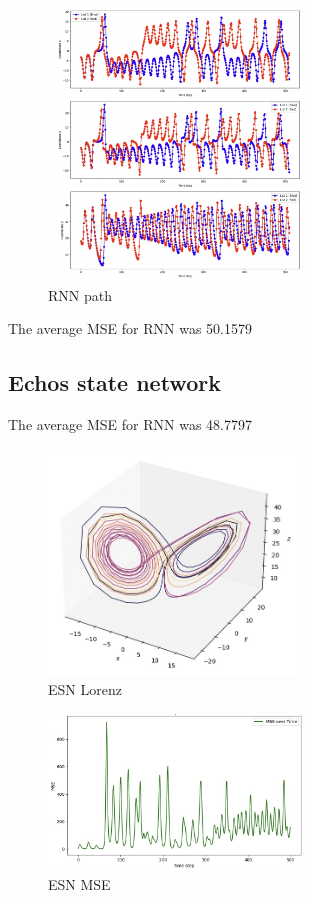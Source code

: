 \documentclass[11pt]{article}
\begin{document}
\begin{figure}[h]
\centering
\includegraphics[width=0.6\textwidth]{rnn_path.jpeg}
\caption{RNN path}
\end{figure}

The average MSE for RNN was 50.1579

\subsection{Echos state network}
The average MSE for RNN was 48.7797

\begin{figure}[h]
\centering
\includegraphics[width=0.6\textwidth]{echo_lorenz.jpeg}
\caption{ESN Lorenz}
\end{figure}

\begin{figure}[h]
\centering
\includegraphics[width=0.6\textwidth]{echo_mse.jpeg}
\caption{ESN MSE}
\end{figure}
\end{document}
